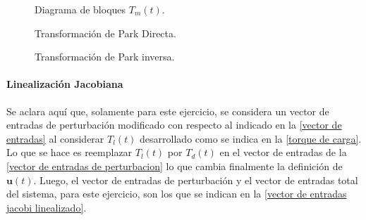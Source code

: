 \documentclass[a4paper, 10pt, onecolumn,journal]{ieeeconf}
\begin{document}
\begin{figure}[H]
    \centering
    \begin{adjustbox}{max width=\columnwidth}
    \end{adjustbox}
    \caption{Diagrama de bloques $T_m(t)$.}
    \label{diagrama de bloques T_m}
\end{figure}

\begin{figure}[H]
    \centering
    \begin{adjustbox}{max width=\columnwidth}
    \end{adjustbox}
    \caption{Transformación de Park Directa.}
    \label{transformacion de Park}
\end{figure}

\begin{figure}[H]
    \centering
    \begin{adjustbox}{max width=\columnwidth}
    \end{adjustbox}
    \caption{Transformación de Park inversa.}
    \label{transformacion de Park inversa}
\end{figure}

\paragraph{\textbf{Linealización Jacobiana}}
Se aclara aquí que, solamente para este ejercicio, se considera un vector de entradas de perturbación modificado
con respecto al indicado en la \cref{vector de entradas} al considerar $T_l(t)$ desarrollado como se indica en la \cref{torque de carga}.
Lo que se hace es reemplazar $T_l(t)$ por $T_d(t)$ en el vector de entradas de la \cref{vector de entradas de perturbacion} lo
que cambia finalmente la definición de $\mathbf{u}(t)$. Luego, el vector
de entradas de perturbación y el vector de entradas total del sistema, para este ejercicio, son los que se indican en la \cref{vector de entradas jacobi linealizado}.
\end{document}
